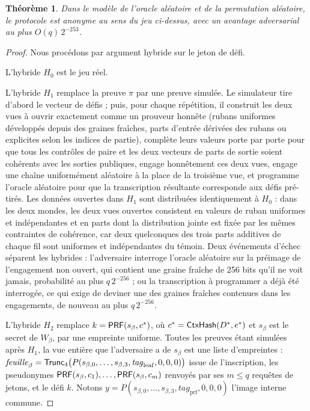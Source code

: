 \documentclass[11pt]{article}
\newtheorem{theorem}{Th\'eor\`eme}
\theoremstyle{definition}
\begin{document}
\begin{theorem}
\label{thm:anon}
Dans le modèle de l'oracle aléatoire et de la permutation aléatoire, le protocole est
anonyme au sens du jeu ci-dessus, avec un avantage adversarial au plus $O(q)\,2^{-253}$.
\end{theorem}

\begin{proof}
Nous procédons par argument hybride sur le jeton de défi.

L'hybride $H_0$ est le jeu réel.

L'hybride $H_1$ remplace la preuve $\pi$ par une preuve simulée. Le simulateur tire
d'abord le vecteur de défis ; puis, pour chaque répétition, il construit les deux vues à
ouvrir exactement comme un prouveur honnête (rubans uniformes développés depuis des
graines fraîches, parts d'entrée dérivées des rubans ou explicites selon les indices de
partie), complète leurs valeurs porte par porte pour que tous les contrôles de paire et
les deux vecteurs de parts de sortie soient cohérents avec les sorties publiques, engage
honnêtement ces deux vues, engage une chaîne uniformément aléatoire à la place de la
troisième vue, et programme l'oracle aléatoire pour que la transcription résultante
corresponde aux défis pré-tirés. Les données ouvertes dans $H_1$ sont distribuées
identiquement à $H_0$ : dans les deux mondes, les deux vues ouvertes consistent en valeurs
de ruban uniformes et indépendantes et en parts dont la distribution jointe est fixée par
les mêmes contraintes de cohérence, car deux quelconques des trois parts additives de
chaque fil sont uniformes et indépendantes du témoin. Deux événements d'échec séparent les
hybrides : l'adversaire interroge l'oracle aléatoire sur la préimage de l'engagement non
ouvert, qui contient une graine fraîche de 256 bits qu'il ne voit jamais, probabilité au
plus $q\,2^{-256}$ ; ou la transcription à programmer a déjà été interrogée, ce qui exige
de deviner une des graines fraîches contenues dans les engagements, de nouveau au plus
$q\,2^{-256}$.

L'hybride $H_2$ remplace $k = \mathsf{PRF}(s_\beta, c^*)$, où $c^* = \mathsf{CtxHash}(D^*, e^*)$ et
$s_\beta$ est le secret de $W_\beta$, par une empreinte uniforme. Toutes les preuves étant
simulées après $H_1$, la vue entière que l'adversaire a de $s_\beta$ est une liste
d'empreintes : $\mathit{feuille}_\beta = \mathsf{Trunc}_4\bigl(P(s_{\beta,0}, \ldots, s_{\beta,3},
\mathit{tag}_{\mathrm{leaf}}, 0, 0, 0)\bigr)$ issue de l'inscription, les pseudonymes
$\mathsf{PRF}(s_\beta, c_1), \ldots, \mathsf{PRF}(s_\beta, c_m)$ renvoyés par ses $m \le q$ requêtes de
jetons, et le défi $k$. Notons $y = P(s_{\beta,0}, \ldots, s_{\beta,3},
\mathit{tag}_{\mathrm{prf}}, 0, 0, 0)$ l'image interne commune.


\end{proof}
\end{document}
